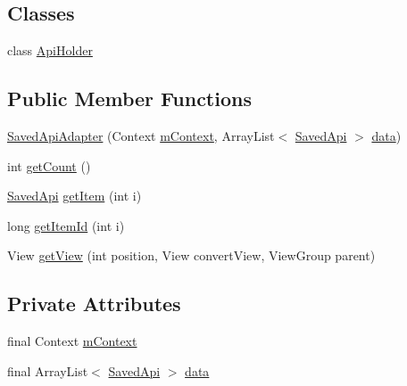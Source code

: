 \subsection*{Classes}
\begin{DoxyCompactItemize}
\item 
class \hyperlink{classorg_1_1buildmlearn_1_1toolkit_1_1adapter_1_1SavedApiAdapter_1_1ApiHolder}{Api\+Holder}
\end{DoxyCompactItemize}
\subsection*{Public Member Functions}
\begin{DoxyCompactItemize}
\item 
\hyperlink{classorg_1_1buildmlearn_1_1toolkit_1_1adapter_1_1SavedApiAdapter_a35115a4c379942a0048a0a04ab25e04c}{Saved\+Api\+Adapter} (Context \hyperlink{classorg_1_1buildmlearn_1_1toolkit_1_1adapter_1_1SavedApiAdapter_a4a19cbb843b42a80c9c010a9e2cad968}{m\+Context}, Array\+List$<$ \hyperlink{classorg_1_1buildmlearn_1_1toolkit_1_1model_1_1SavedApi}{Saved\+Api} $>$ \hyperlink{classorg_1_1buildmlearn_1_1toolkit_1_1adapter_1_1SavedApiAdapter_a0b4dd014c7fce78391c25501eb75985e}{data})
\item 
int \hyperlink{classorg_1_1buildmlearn_1_1toolkit_1_1adapter_1_1SavedApiAdapter_a097b026a6cde20cffd6090f51df46c45}{get\+Count} ()
\item 
\hyperlink{classorg_1_1buildmlearn_1_1toolkit_1_1model_1_1SavedApi}{Saved\+Api} \hyperlink{classorg_1_1buildmlearn_1_1toolkit_1_1adapter_1_1SavedApiAdapter_a6e9c4fa7bc191983a8b25b1aebf89425}{get\+Item} (int i)
\item 
long \hyperlink{classorg_1_1buildmlearn_1_1toolkit_1_1adapter_1_1SavedApiAdapter_aa75156647c099f3ada267b445c7bdf34}{get\+Item\+Id} (int i)
\item 
View \hyperlink{classorg_1_1buildmlearn_1_1toolkit_1_1adapter_1_1SavedApiAdapter_aef9901fc7bfeeac87219e6cb8bf89068}{get\+View} (int position, View convert\+View, View\+Group parent)
\end{DoxyCompactItemize}
\subsection*{Private Attributes}
\begin{DoxyCompactItemize}
\item 
final Context \hyperlink{classorg_1_1buildmlearn_1_1toolkit_1_1adapter_1_1SavedApiAdapter_a4a19cbb843b42a80c9c010a9e2cad968}{m\+Context}
\item 
final Array\+List$<$ \hyperlink{classorg_1_1buildmlearn_1_1toolkit_1_1model_1_1SavedApi}{Saved\+Api} $>$ \hyperlink{classorg_1_1buildmlearn_1_1toolkit_1_1adapter_1_1SavedApiAdapter_a0b4dd014c7fce78391c25501eb75985e}{data}
\end{DoxyCompactItemize}


